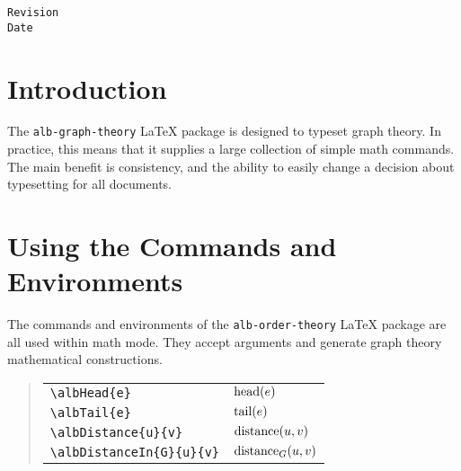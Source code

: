\documentclass[11pt,a4paper,oneside,titlepage]{alb-latex}
\begin{document}
\begin{albTitlePage}

  \verb$Revision$\\
  \verb$Date$

\end{albTitlePage}




\section{Introduction}
\label{sec:alb-graph-theory-documentation:intr}

The \texttt{alb-graph-theory} \LaTeX{} package is designed to typeset
graph theory.  In practice, this means that it supplies a large
collection of simple math commands.  The main benefit is consistency,
and the ability to easily change a decision about typesetting for all
documents.




\section{Using the Commands and Environments}
\label{sec:alb-order-theory-documentation:using-comm-envir}

The commands and environments of the \texttt{alb-order-theory} \LaTeX{}
package are all used within math mode.  They accept arguments and
generate graph theory mathematical constructions.

\begin{quote}
  \begin{tabular}{p{}@{\qquad}p{}}
    \verb$\albHead{e}$ & $\operatorname{head}(e)$ \\
    \verb$\albTail{e}$ & $\operatorname{tail}(e)$ \\
    \verb$\albDistance{u}{v}$ & $\operatorname{distance}(u, v)$ \\
    \verb$\albDistanceIn{G}{u}{v}$ & $\albDistanceIn{G}{u}{v}$
  \end{tabular}
\end{quote}



\end{document}
